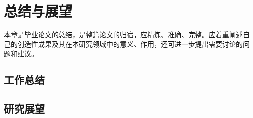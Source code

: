 \chapter{总结与展望}
本章是毕业论文的总结，是整篇论文的归宿，应精炼、准确、完整。应着重阐述自己的创造性成果及其在本研究领域中的意义、作用，还可进一步提出需要讨论的问题和建议。

\section{工作总结}

\section{研究展望}
